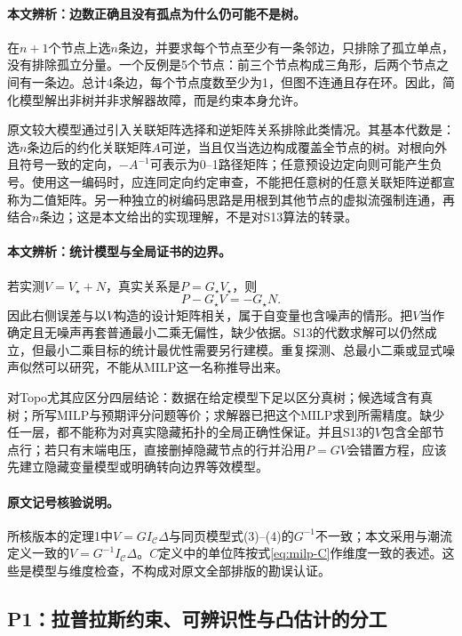 \paragraph{本文辨析：边数正确且没有孤点为什么仍可能不是树。}
在$n+1$个节点上选$n$条边，并要求每个节点至少有一条邻边，只排除了孤立单点，没有排除孤立分量。一个反例是5个节点：前三个节点构成三角形，后两个节点之间有一条边。总计4条边，每个节点度数至少为1，但图不连通且存在环。因此，简化模型解出非树并非求解器故障，而是约束本身允许。

原文较大模型通过引入关联矩阵选择和逆矩阵关系排除此类情况。其基本代数是：选$n$条边后的约化关联矩阵$A$可逆，当且仅当选边构成覆盖全节点的树。对根向外且符号一致的定向，$-A^{-1}$可表示为0--1路径矩阵；任意预设边定向则可能产生负号。使用这一编码时，应连同定向约定审查，不能把任意树的任意关联矩阵逆都宣称为二值矩阵。另一种独立的树编码思路是用根到其他节点的虚拟流强制连通，再结合$n$条边；这是本文给出的实现理解，不是对S13算法的转录。

\paragraph{本文辨析：统计模型与全局证书的边界。}
若实测$V=V_\star+N$，真实关系是$P=G_\star V_\star$，则
\begin{equation}
 P-G_\star V=-G_\star N.
 \label{eq:milp-eiv}
\end{equation}
因此右侧误差与以$V$构造的设计矩阵相关，属于自变量也含噪声的情形。把$V$当作确定且无噪声再套普通最小二乘无偏性，缺少依据。S13的代数求解可以仍然成立，但最小二乘目标的统计最优性需要另行建模。重复探测、总最小二乘或显式噪声似然可以研究，不能从MILP这一名称推导出来。

对Topo尤其应区分四层结论：数据在给定模型下足以区分真树；候选域含有真树；所写MILP与预期评分问题等价；求解器已把这个MILP求到所需精度。缺少任一层，都不能称为对真实隐藏拓扑的全局正确性保证。并且S13的$V$包含全部节点行；若只有末端电压，直接删掉隐藏节点的行并沿用$P=GV$会错置方程，应该先建立隐藏变量模型或明确转向边界等效模型。

\paragraph{原文记号核验说明。}
所核版本的定理1中$V=GI_{\mathcal C}\Delta$与同页模型式(3)--(4)的$G^{-1}$不一致；本文采用与潮流定义一致的$V=G^{-1}I_{\mathcal C}\Delta$。$C$定义中的单位阵按式\eqref{eq:milp-C}作维度一致的表述。这些是模型与维度检查，不构成对原文全部排版的勘误认证。

\subsection{P1：拉普拉斯约束、可辨识性与凸估计的分工}
\label{subsec:P1}

